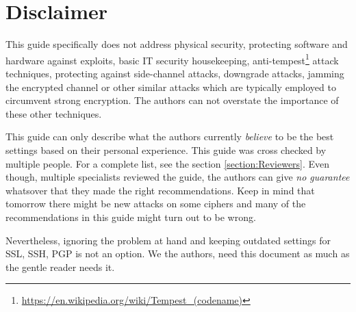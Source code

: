\section{Disclaimer}
\label{section:disclaimer}
This guide specifically does not address physical security, protecting software and hardware against exploits, basic IT security housekeeping, anti-tempest\footnote{\url{https://en.wikipedia.org/wiki/Tempest\_(codename)}} attack techniques, protecting against side-channel attacks, downgrade attacks, jamming the encrypted channel or other similar attacks which are typically employed to circumvent strong encryption. The authors can not overstate the importance of these other techniques.

This guide can only describe what the authors currently \emph{believe} to be the best settings based on their personal experience. This guide was cross checked by multiple people. For a complete list, see the section \ref{section:Reviewers}. Even though, multiple specialists reviewed the guide, the authors can give \emph{no guarantee} whatsover that they made the right recommendations. Keep in mind that tomorrow there might be new attacks on some ciphers and many of the recommendations in this guide might turn out to be wrong.



Nevertheless, ignoring the problem at hand and keeping outdated settings for SSL, SSH, PGP is not an option. We the authors, need this document as much as the gentle reader needs it.

